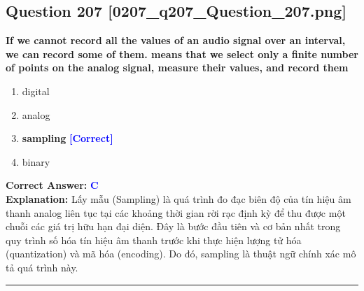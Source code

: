 \documentclass[11pt,a4paper]{article}
\begin{document}
\begin{minipage}{\textwidth}
\subsection*{Question 207 \quad \footnotesize{[0207\_q207\_Question\_207.png]}}
\noindent \textbf{If we cannot record all the values of an audio signal over an interval, we can record some of them. means that we select only a finite number of points on the analog signal, measure their values, and record them}

\begin{enumerate}[label=\Alph*.]
    \item digital
    \item analog
    \item \textbf{sampling} \hfill \textcolor{blue}{\textbf{[Correct]}}
    \item binary
\end{enumerate}

\noindent \textbf{Correct Answer:} \textcolor{blue}{\textbf{C}} \\[2pt]
\noindent \textbf{Explanation:} Lấy mẫu (Sampling) là quá trình đo đạc biên độ của tín hiệu âm thanh analog liên tục tại các khoảng thời gian rời rạc định kỳ để thu được một chuỗi các giá trị hữu hạn đại diện. Đây là bước đầu tiên và cơ bản nhất trong quy trình số hóa tín hiệu âm thanh trước khi thực hiện lượng tử hóa (quantization) và mã hóa (encoding). Do đó, sampling là thuật ngữ chính xác mô tả quá trình này.

\par\vspace{0.3cm}
\hrule
\vspace{0.3cm}
\end{minipage}
\end{document}
